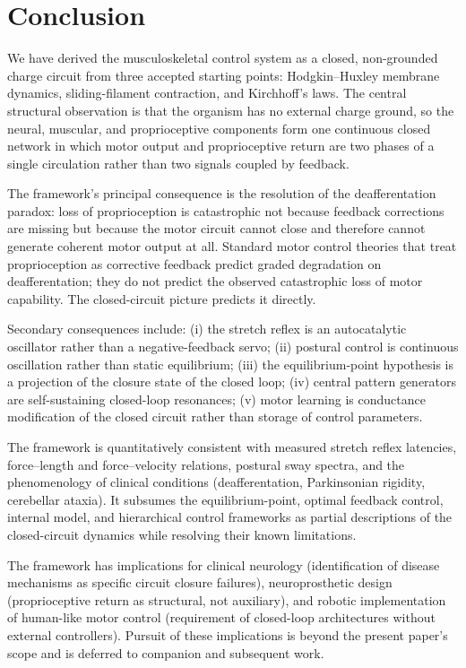 \documentclass[11pt,twocolumn,a4paper]{article}
\theoremstyle{definition}
\theoremstyle{remark}
\begin{document}
\section{Conclusion}
\label{sec:conclusion}

We have derived the musculoskeletal control system as a closed,
non-grounded charge circuit from three accepted starting points:
Hodgkin--Huxley membrane dynamics, sliding-filament contraction,
and Kirchhoff's laws. The central structural observation is that the
organism has no external charge ground, so the neural, muscular, and
proprioceptive components form one continuous closed network in which
motor output and proprioceptive return are two phases of a single
circulation rather than two signals coupled by feedback.

The framework's principal consequence is the resolution of the
deafferentation paradox: loss of proprioception is catastrophic not
because feedback corrections are missing but because the motor circuit
cannot close and therefore cannot generate coherent motor output at
all. Standard motor control theories that treat proprioception as
corrective feedback predict graded degradation on deafferentation;
they do not predict the observed catastrophic loss of motor
capability. The closed-circuit picture predicts it directly.

Secondary consequences include: (i) the stretch reflex is an
autocatalytic oscillator rather than a negative-feedback servo; (ii)
postural control is continuous oscillation rather than static
equilibrium; (iii) the equilibrium-point hypothesis is a projection
of the closure state of the closed loop; (iv) central pattern
generators are self-sustaining closed-loop resonances; (v) motor
learning is conductance modification of the closed circuit rather
than storage of control parameters.

The framework is quantitatively consistent with measured stretch
reflex latencies, force--length and force--velocity relations,
postural sway spectra, and the phenomenology of clinical conditions
(deafferentation, Parkinsonian rigidity, cerebellar ataxia). It
subsumes the equilibrium-point, optimal feedback control, internal
model, and hierarchical control frameworks as partial descriptions of
the closed-circuit dynamics while resolving their known limitations.

The framework has implications for clinical neurology (identification
of disease mechanisms as specific circuit closure failures),
neuroprosthetic design (proprioceptive return as structural, not
auxiliary), and robotic implementation of human-like motor control
(requirement of closed-loop architectures without external controllers).
Pursuit of these implications is beyond the present paper's scope and
is deferred to companion and subsequent work.




\end{document}
